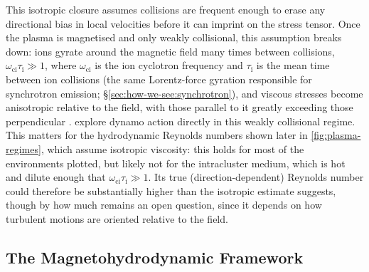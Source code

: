 This isotropic closure assumes collisions are frequent enough to erase any directional bias in local velocities before it can imprint on the stress tensor. Once the plasma is magnetised and only weakly collisional, this assumption breaks down: ions gyrate around the magnetic field many times between collisions, $\omega_\mathrm{ci}\tau_\mathrm{i} \gg 1$, where $\omega_\mathrm{ci}$ is the ion cyclotron frequency and $\tau_\mathrm{i}$ is the mean time between ion collisions (the same Lorentz-force gyration responsible for synchrotron emission; \S\ref{sec:how-we-see:synchrotron}), and viscous stresses become anisotropic relative to the field, with those parallel to it greatly exceeding those perpendicular \citep[Braginskii viscosity;][]{braginskii1965transport}. \citet{StOnge2020_weakly_collisional_dynamo} explore dynamo action directly in this weakly collisional regime. This matters for the hydrodynamic Reynolds numbers shown later in \autoref{fig:plasma-regimes}, which assume isotropic viscosity: this holds for most of the environments plotted, but likely not for the intracluster medium, which is hot and dilute enough that $\omega_\mathrm{ci}\tau_\mathrm{i} \gg 1$. Its true (direction-dependent) Reynolds number could therefore be substantially higher than the isotropic estimate suggests, though by how much remains an open question, since it depends on how turbulent motions are oriented relative to the field.

\subsection{The Magnetohydrodynamic Framework}
\label{sec:modelling:mhd}

